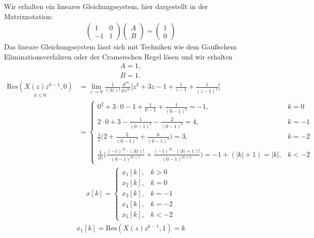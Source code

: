 Wir erhalten ein lineares Gleichungssystem, hier dargestellt in der Matrixnotation:
\begin{align}
	\begin{pmatrix}
		1 & 0 \\
		-1 & 1
	\end{pmatrix}
	\begin{pmatrix}
		A \\
		B
	\end{pmatrix}
	=
	\begin{pmatrix}
		1 \\
		0
	\end{pmatrix}
\end{align}
Das lineare Gleichungssystem lässt sich mit Techniken wie dem Gaußschem Eliminationsverfahren oder der Cramerschen Regel lösen und wir erhalten
\begin{align}
	A = 1, \nonumber \\
	B = 1.
\end{align}
\begin{align}
	\underset{k\leq0}{\mathrm{Res}(X(z)z^{k-1},0)}&=\lim\limits_{z\rightarrow0}\frac{1}{(|k|)!}\frac{\mathrm{d}^{|k|}}{\mathrm{d}z^{|k|}}\Bigg[z^2+3z-1+\frac{1}{z-1}+\frac{1}{(z-1)^2}\Bigg]\nonumber\\
	&=\begin{cases}
		0^2+3\cdot0-1+\frac{1}{0-1}+\frac{1}{(0-1)^2}=-1, &k=0 \\
		2\cdot0+3-\frac{1}{(0-1)^2}-\frac{2}{(0-1)^3}=4,&k=-1 \\
		\frac{1}{2}\bigg(2+\frac{2}{(0-1)^3}+\frac{6}{(0-1)^4}\bigg)=3,&k=-2\\
		\frac{1}{|k|}\bigg(\frac{(-1)^{|k|}\cdot (|k|)!}{(0-1)^{|k|+1}}+\frac{(-1)^{|k|}\cdot(|k|+1)!}{(0-1)^{|k|+2}}\bigg)=-1+(|k|+1)=|k|,&k<-2
	\end{cases}
\end{align}
\begin{align}
	x[k]=\begin{cases}
		x_1[k],&k>0 \\
		x_2[k], &k=0 \\
		x_3[k], &k=-1 \\
		x_4[k], &k=-2 \\
		x_5[k], &k<-2
	\end{cases}
\end{align}
\begin{align}
	x_1[k]=\mathrm{Res}(X(z)z^{k-1},1)=k
\end{align}
